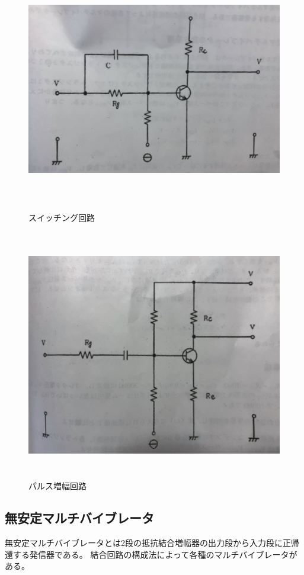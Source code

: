 \documentclass[12pt]{jarticle}
\begin{document}
\begin{figure}[h]
    \begin{center}
        \includegraphics[bb=0 0 3531 2371,height=10cm]{parusu_3.jpg}
    \end{center}
    \caption{スイッチング回路}
    \label{fig3}
    \begin{center}
        \includegraphics[bb=0 0 3517 2770,height=11cm]{parusu_4.jpg}
    \end{center}
    \caption{パルス増幅回路}
    \label{fig4}
\end{figure}
\clearpage

\subsection{無安定マルチバイブレータ}
無安定マルチバイブレータとは2段の抵抗結合増幅器の出力段から入力段に正帰還する発信器である。
結合回路の構成法によって各種のマルチバイブレータがある。
\end{document}

